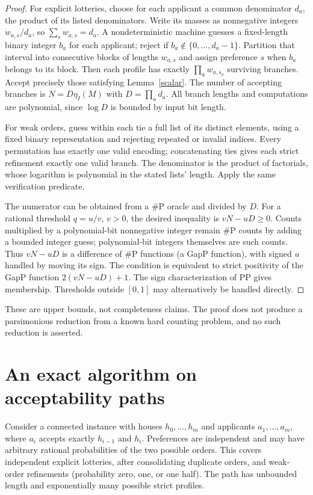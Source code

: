 \documentclass[11pt]{article}
\theoremstyle{remark}
\begin{document}
\begin{proof}
For explicit lotteries, choose for each applicant a common denominator $d_a$, the product of its listed denominators. Write its masses as nonnegative integers $w_{a,s}/d_a$, so $\sum_s w_{a,s}=d_a$. A nondeterministic machine guesses a fixed-length binary integer $b_a$ for each applicant; reject if $b_a\notin\{0,\ldots,d_a-1\}$. Partition that interval into consecutive blocks of lengths $w_{a,s}$ and assign preference $s$ when $b_a$ belongs to its block. Then each profile has exactly $\prod_a w_{a,s_a}$ surviving branches. Accept precisely those satisfying Lemma~\ref{scalar}. The number of accepting branches is $N=D\eta_I(M)$ with $D=\prod_a d_a$. All branch lengths and computations are polynomial, since $\log D$ is bounded by input bit length.

For weak orders, guess within each tie a full list of its distinct elements, using a fixed binary representation and rejecting repeated or invalid indices. Every permutation has exactly one valid encoding; concatenating ties gives each strict refinement exactly one valid branch. The denominator is the product of factorials, whose logarithm is polynomial in the stated lists' length. Apply the same verification predicate.

The numerator can be obtained from a \#P oracle and divided by $D$. For a rational threshold $q=u/v$, $v>0$, the desired inequality is $vN-uD\geq0$. Counts multiplied by a polynomial-bit nonnegative integer remain \#P counts by adding a bounded integer guess; polynomial-bit integers themselves are such counts. Thus $vN-uD$ is a difference of \#P functions (a GapP function), with signed $u$ handled by moving its sign. The condition is equivalent to strict positivity of the GapP function $2(vN-uD)+1$. The sign characterization of PP gives membership. Thresholds outside $[0,1]$ may alternatively be handled directly.
\end{proof}

These are upper bounds, not completeness claims. The proof does not produce a parsimonious reduction from a known hard counting problem, and no such reduction is asserted.

\section{An exact algorithm on acceptability paths}
Consider a connected instance with houses $h_0,\ldots,h_m$ and applicants $a_1,\ldots,a_m$, where $a_i$ accepts exactly $h_{i-1}$ and $h_i$. Preferences are independent and may have arbitrary rational probabilities of the two possible orders. This covers independent explicit lotteries, after consolidating duplicate orders, and weak-order refinements (probability zero, one, or one half). The path has unbounded length and exponentially many possible strict profiles.
\end{document}
